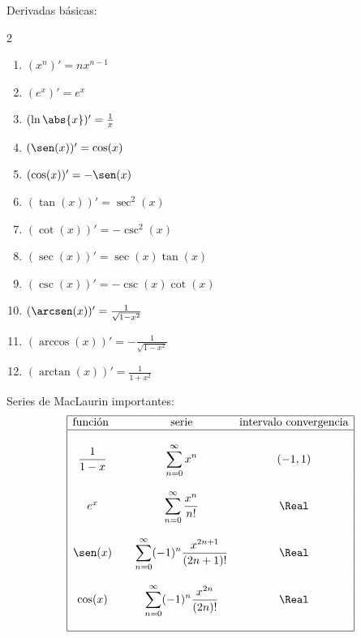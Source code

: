 \documentclass{article}
\begin{document}
{\large Derivadas básicas:}
\begin{multicols}{2}
  \begin{enumerate}
    \item $(x^n)' = nx^{n-1}$
    \item $(e^x)' = e^x$
    \item $(\ln\abs{x})' = \frac{1}{x}$
    \item $(\sen(x))' = \cos(x)$
    \item $(\cos(x))' = -\sen(x)$
    \item $(\tan(x))' = \sec^2(x)$
    \item $(\cot(x))' = -\csc^2(x)$
    \item $(\sec(x))' = \sec(x)\tan(x)$
    \item $(\csc(x))' = -\csc(x)\cot(x)$
    \item $(\arcsen(x))' = \frac{1}{\sqrt{1-x^2}}$
    \item $(\arccos(x))' = -\frac{1}{\sqrt{1-x^2}}$
    \item $(\arctan(x))' = \frac{1}{1+x^2}$
  \end{enumerate}
\end{multicols}
\vspace{2mm}

Series de MacLaurin importantes:
$$\begin{array}{|cccc|}
  \hline
  \text{función } & & \text{serie} & \text{intervalo convergencia}\\
  \hline
  & & & \\
  \dfrac{1}{1-x} & & \displaystyle\sum_{n=0}^\infty x^n & (-1,1)\\
  & & & \\
  e^x & & \displaystyle\sum_{n=0}^\infty \frac{x^n}{n!} & \Real\\
  & & & \\
  \sen(x) & & \displaystyle\sum_{n=0}^\infty (-1)^n\frac{x^{2n+1}}{(2n+1)!} & \Real\\
  & & & \\
  \cos(x) & & \displaystyle\sum_{n=0}^\infty (-1)^n\frac{x^{2n}}{(2n)!} & \Real\\
  & & & \\
  \hline
\end{array}$$
\vspace{2mm}
\end{document}

